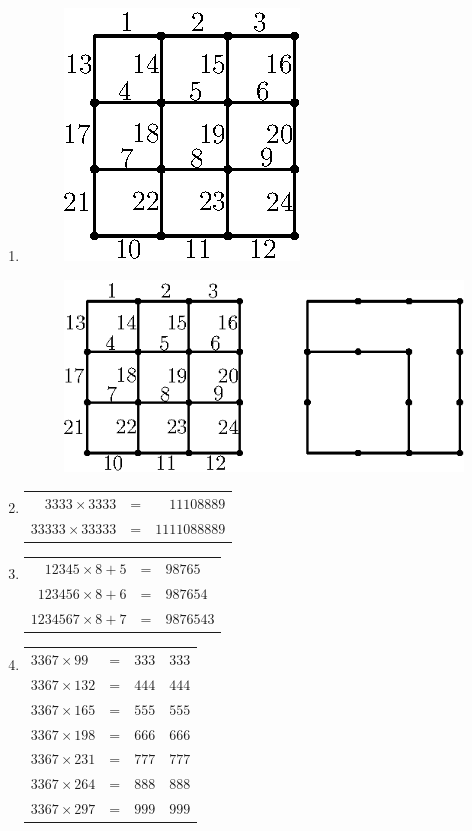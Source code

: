 \begin{enumerate}
\item
\begin{figure}[H]
\centering
\includegraphics{images/chap3/ans16a.eps}
\end{figure}

\begin{figure}[H]
\centering
\includegraphics{images/chap3/ans16.eps}
\end{figure}

\item 
\begin{tabular}[t]{rrr}
$3333 \times 3333$ & = & $11108889$\\
$33333 \times 33333$ & = & $1111088889$
\end{tabular}

\smallskip
\item 
\begin{tabular}[t]{rrl}
$12345 \times 8 + 5$ & = & $98765$\\
$123456 \times 8 + 6$ & = & $987654$\\
$1234567 \times 8 + 7$ & = & $9876543$
\end{tabular}

\smallskip
\item
\begin{tabular}[t]{llll}
$3367 \times 99$ & = & $333$ & $333$\\
$3367 \times 132$ & = & $444$ & $444$\\
$3367 \times 165$ & = & $555$ & $555$\\
$3367 \times 198$ & = & $666$ & $666$\\
$3367 \times 231$ & = & $777$ & $777$\\
$3367 \times 264$ & = & $888$ & $888$\\
$3367 \times 297$ & = & $999$ & $999$
\end{tabular}


\end{enumerate}
